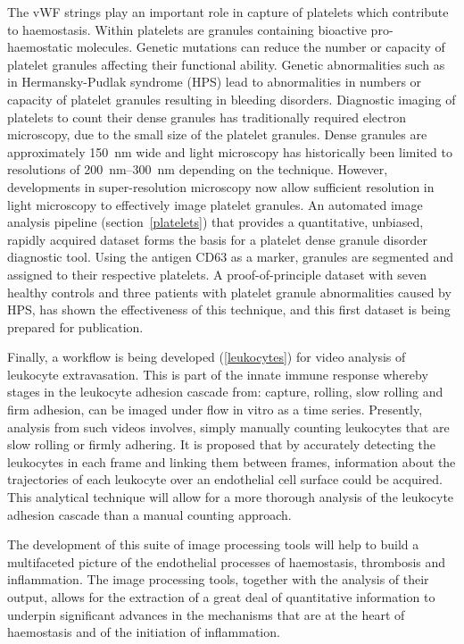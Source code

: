 The vWF strings play an important role in capture of platelets which contribute to haemostasis. Within platelets are granules containing bioactive pro-haemostatic molecules.  Genetic mutations can reduce the number or capacity of platelet granules affecting their functional ability. Genetic abnormalities such as in Hermansky-Pudlak syndrome (HPS) lead to abnormalities in numbers or capacity of platelet granules resulting in bleeding disorders. Diagnostic imaging of platelets to count their dense granules has traditionally required electron microscopy, due to the small size of the platelet granules. Dense granules are approximately \SI{150}{\nano\metre} wide and light microscopy has historically been limited to resolutions of  \SIrange{200}{300}{\nano\metre} depending on the technique. However, developments in super-resolution microscopy now allow sufficient resolution in light microscopy to effectively image platelet granules. An automated image analysis pipeline (section~\autoref{platelets}) that provides a quantitative, unbiased, rapidly acquired dataset forms the basis for a platelet dense granule disorder diagnostic tool. Using the antigen CD63 as a marker, granules are segmented and assigned to their respective platelets. A proof-of-principle dataset with seven healthy controls and three patients with platelet granule abnormalities caused by HPS, has shown the effectiveness of this technique, and this first dataset is being prepared for publication.

Finally, a workflow is being developed (\autoref{leukocytes}) for video analysis of leukocyte extravasation. This is part of the innate immune response whereby stages in the leukocyte adhesion cascade from: capture, rolling, slow rolling and firm adhesion, can be imaged under flow in vitro as a time series. Presently, analysis from such videos involves, simply manually counting leukocytes that are slow rolling or firmly adhering. It is proposed that by accurately detecting the leukocytes in each frame and linking them between frames, information about the trajectories of each leukocyte over an endothelial cell surface could be acquired. This analytical technique will allow for a more thorough analysis of the leukocyte adhesion cascade than a manual counting approach.

The development of this suite of image processing tools will help to build a multifaceted picture of the endothelial processes of haemostasis, thrombosis and inflammation. The image processing tools, together with the analysis of their output, allows for the extraction of a great deal of quantitative information to underpin significant advances in the mechanisms that are at the heart of haemostasis and of the initiation of inflammation.

